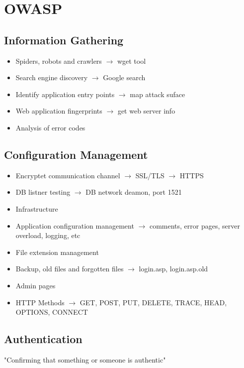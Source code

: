 \chapter{OWASP}

\section{Information Gathering}
	
	\begin{itemize}
		\item Spiders, robots and crawlers $\rightarrow$ wget tool
		\item Search engine discovery $\rightarrow$ Google search
		\item Identify application entry points $\rightarrow$ map attack suface
		\item Web application fingerprints $\rightarrow$ get web server info
		\item Analysis of error codes
	\end{itemize}

\section{Configuration Management}

	\begin{itemize}
		\item Encryptet communication channel $\rightarrow$ SSL/TLS $\rightarrow$ HTTPS
		\item DB listner testing $\rightarrow$ DB network deamon, port 1521
		\item Infrastructure
		\item Application configuration management $\rightarrow$ comments, error pages, server overload, logging, etc
		\item File extension management
		\item Backup, old files and forgotten files $\rightarrow$ login.asp, login.asp.old
		\item Admin pages
		\item HTTP Methods $\rightarrow$ GET, POST, PUT, DELETE, TRACE, HEAD, OPTIONS, CONNECT
	\end{itemize}

\section{Authentication}
"Confirming that something or someone is authentic"

